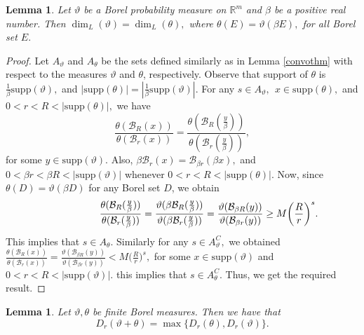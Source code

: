 \documentclass{amsproc}
\newtheorem{lemma}[theorem]{Lemma}
\theoremstyle{definition}
\theoremstyle{remark}
\numberwithin{equation}{section}
\begin{document}
\begin{lemma}\label{1179}
    Let $\vartheta$ be a Borel probability measure on $\mathbb{R}^m$ and $\beta$ be a positive real number. Then $\dim_{L}(\vartheta)=\dim_{L}(\theta),$ where $\theta(E)=\vartheta(\beta E),$ for all Borel set $E.$  
\end{lemma}
\begin{proof}
    Let $A_{\vartheta}$ and $A_{\theta}$ be the sets defined similarly as in Lemma \ref{convothm} with respect to the measures $\vartheta$ and $\theta$, respectively. Observe that support of $\theta$ is $\frac{1}{\beta} \text{supp}(\vartheta),$ and $|\text{supp}(\theta)|= |\frac{1}{\beta} \text{supp}(\vartheta)|.$ For any $s \in A_{\vartheta}, ~~x \in \text{supp}(\theta),$ and $0< r < R < |\text{supp}(\theta)|,$ we have
\[
\frac{\theta(\mathcal{B}_R(x))}{\theta(\mathcal{B}_r(x))} = \frac{\theta(\mathcal{B}_R(\frac{y}{\beta}))}{\theta(\mathcal{B}_r(\frac{y}{\beta}))},
\]
for some $y \in \text{supp}(\vartheta).$ Also, $\beta \mathcal{B}_r(x)= \mathcal{B}_{\beta r}(\beta x),$ and $0< \beta r < \beta R <|\text{supp}(\vartheta)|$ whenever $0 < r < R< |\text{supp}(\theta)|.$ Now, since $\theta(D)= \vartheta(\beta D)$ for any Borel set $D$, we obtain
\begin{equation*}
    \begin{aligned}
     \hspace{1.9cm} \frac{\theta(\mathcal{B}_R(\frac{y}{\beta}))}{\theta(\mathcal{B}_r(\frac{y}{\beta}))} = \frac{\vartheta(\beta \mathcal{B}_R(\frac{y}{\beta}))}{\vartheta(\beta \mathcal{B}_r(\frac{y}{\beta}))} = \frac{\vartheta(\mathcal{B}_{\beta R}(y))}{\vartheta(\mathcal{B}_{\beta r}(y))}  \ge M \bigg(\frac{R}{r}\bigg)^s.  
    \end{aligned}
\end{equation*}
This implies that $s \in A_{\theta}.$
Similarly for any $s \in A_{\vartheta}^C,$ we obtained
$\frac{\theta(\mathcal{B}_R(x))}{\theta(\mathcal{B}_r(x))} = \frac{\vartheta(\mathcal{B}_{\beta R}(y))}{\vartheta(\mathcal{B}_{\beta r}(y))} < M \bigg(\frac{R}{r}\bigg)^s,$ for some $x \in \text{supp}(\vartheta)$ and $0 < r < R < |\text{supp}(\vartheta)|.$ this implies that $s \in A_{\theta}^C.$
Thus, we get the required result.
\end{proof}
 \begin{lemma}\label{lipdim}
Let $\vartheta, \theta$ be finite Borel measures. Then we have that 
\[
D_r(\vartheta+\theta) = \max\{D_r(\theta),D_r(\vartheta)\}.
\]
 \end{lemma}
\end{document}
